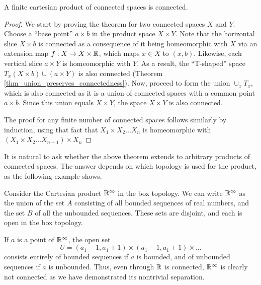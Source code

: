 \documentclass[a4paper,english,12pt]{article}
\begin{document}
\begin{thm}
A finite cartesian product of connected spaces is connected.
\end{thm}
\begin{proof}
We start by proving the theorem for two connected spaces $X$ and $Y$. Choose a ``base point'' $a \times b$ in the product space $X \times Y$. 
Note that the horizontal slice $X \times b$ is connected as a consequence of it being homeomorphic with $X$ via an extension map $f: X \to 
X \times \mathbb{R}$, which maps $x \in X$ to $(x, b)$. Likewise, each vertical slice $a \times Y$ is homeomorphic with $Y$. As a result, the 
``T-shaped'' space $T_{x} (X \times b) \cup (a \times Y)$ is also connected (Theorem \ref{thm_union_preserves_connectedness}). Now, proceed
to form the union $\cup_{x} T_{x}$, which is also connected as it is a union of connected spaces with a common point $a \times b$. Since 
this union equals $X \times Y$, the space $X \times Y$ is also connected.

The proof for any finite number of connected spaces follows similarly by induction, using that fact that $X_{1} \times X_{2} \dots X_{n}$
is homeomorphic with $(X_{1} \times X_{2} \dots X_{n-1}) \times X_{n}$
\end{proof}

It is natural to ask whether the above theorem extends to arbitrary products of connected spaces. The answer depends on which topology is 
used for the product, as the following example shows.
\begin{exmp}
Consider the Cartesian product $\mathbb{R}^{\infty}$ in the box topology. We can write $\mathbb{R}^{\infty}$ as the union of the 
set $A$ consisting of all bounded sequences of real numbers, and the set $B$ of all the unbounded sequences. 
These sets are disjoint, and each is open in the box topology. 

If $a$ is a point of $\mathbb{R}^{\infty}$, the open set
\begin{equation*}
 U = (a_{1}-1, a_{1} + 1) \times (a_{1}-1, a_{1} + 1) \times \dots
\end{equation*}
consists entirely of bounded sequences if $a$ is bounded, and of unbounded sequences if $a$ is unbounded. Thus, even through $\mathbb{R}$ is connected, 
$\mathbb{R}^{\infty}$ is clearly not connected as we have demonstrated its nontrivial separation.
\end{exmp}
\end{document}
